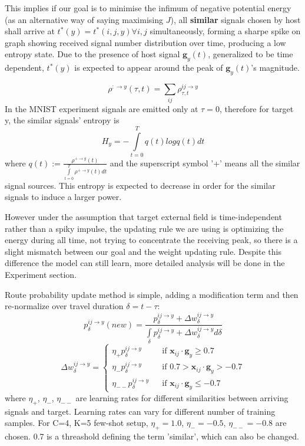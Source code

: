 \documentclass[11pt,a4paper]{article}
\begin{document}
\begin{multicols}{2}
This implies if our goal is to minimise the infimum of negative potential energy (as an alternative way of saying maximising $J$), all \textbf{similar} signals chosen by host shall arrive at $t^*(y)=t^*(i,j,y) \forall i,j$ simultaneously, forming a sharpe spike on graph showing received signal number distribution over time, producing a low entropy state. 
Due to the presence of host signal $\boldsymbol{g}_y(t)$, generalized to be time dependent, $t^*(y)$ is expected to appear around the peak of $\boldsymbol{g}_y(t)$'s magnitude. 

$$
\rho^{:\rightarrow y}(\tau, t) = \sum\limits_{ij} \rho_{\tau, t}^{ij \rightarrow y}
$$
In the MNIST experiment signals are emitted only at $\tau=0$, therefore for target y, the similar signals' entropy is 
$$H_y=-\int\limits_{t=0}^T q(t) log q(t) dt$$ 
where $q(t) := \frac{\rho^{+\rightarrow y}(t)} {\int\limits_{t=0}^T \rho^{+\rightarrow y}(t) dt}$ and the superscript symbol '+' means all the similar signal sources. 
This entropy is expected to decrease in order for the similar signals to induce a larger power. 

However under the assumption that target external field is time-independent rather than a spiky impulse, the updating rule we are using is optimizing the energy during all time, 
not trying to concentrate the receiving peak, so there is a slight mismatch between our goal and the weight updating rule. Despite this difference the model can still learn, more detailed analysis will be done in the Experiment section. 

Route probability update method is simple, adding a modification term and then re-normalize over travel duration $\delta = t-\tau$: 
\begin{equation}
  p_{\delta}^{ij\rightarrow y}(new) = \frac{ p_{\delta}^{ij\rightarrow y} + \Delta w_{\delta}^{ij\rightarrow y}} {\int\limits_{\delta} p_{\delta}^{ij\rightarrow y} + \Delta w_{\delta}^{ij\rightarrow y} d\delta }
  \label{eq:update-rule}
\end{equation}
$$
  \Delta w_{\delta}^{ij\rightarrow y} = \left \{
  \begin{array}{rcl}
    \eta_{+} p_{\delta}^{ij\rightarrow y} & & \text{if } \boldsymbol{x}_{ij} \cdot \boldsymbol{g}_y \ge 0.7 \\
    \eta_{-} p_{\delta}^{ij\rightarrow y} & & \text{if } 0.7 > \boldsymbol{x}_{ij} \cdot \boldsymbol{g}_y > -0.7 \\
    \eta_{--} p_{\delta}^{ij\rightarrow y} & & \text{if } \boldsymbol{x}_{ij} \cdot \boldsymbol{g}_y \le -0.7
  \end{array} \right .
$$
where $\eta_{+}$, $\eta_{-}$, $\eta_{--}$ are learning rates for different similarities between arriving signals and target. 
Learning rates can vary for different number of training samples. For C=4, K=5 few-shot setup, $\eta_{+}=1.0$, $\eta_{-}=-0.5$, $\eta_{--}=-0.8$ are chosen. 
0.7 is a threashold defining the term 'similar', which can also be changed.


\end{multicols}
\end{document}
